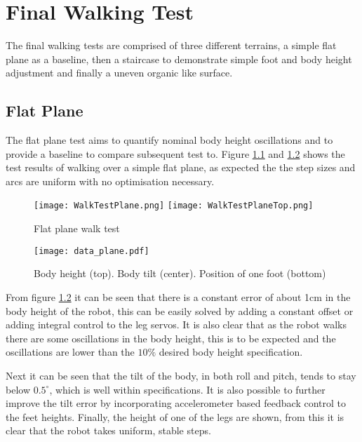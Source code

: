 \chapter{Final Walking Test}
    The final walking tests are comprised of three different terrains, a simple flat plane as a baseline, then a staircase to demonstrate simple foot and body height adjustment and
    finally a uneven organic like surface.
    

    \section{Flat Plane}
    The flat plane test aims to quantify nominal body height oscillations and to provide a baseline to compare subsequent test to.
    Figure \ref{fig:plane_test} and \ref{fig:plane_test_data} shows the test results of walking over a simple flat plane, as expected the the step sizes and arcs are uniform with no optimisation necessary.
    \begin{figure}[h]
        \centering
        \texttt{[image: WalkTestPlane.png]}
        \texttt{[image: WalkTestPlaneTop.png]}
        \caption{Flat plane walk test}
        \label{fig:plane_test}
    \end{figure}
    \begin{figure}[h]
        \centering
        \texttt{[image: data\_plane.pdf]}
        \caption{Body height (top). Body tilt (center). Position of one foot (bottom)}
        \label{fig:plane_test_data}
    \end{figure}
    
    \noindent
    From figure \ref{fig:plane_test_data} it can be seen that there is a constant error of about 1cm in the body height of the robot, this can be easily solved by adding a constant offset or adding integral 
    control to the leg servos. It is also clear that as the robot walks there are some oscillations in the body height, this is to be expected and the oscillations are lower than the \(10\%\) desired body height specification.
        
    Next it can be seen that the tilt of the body, in both roll and pitch, tends to stay below \(0.5^\circ\), which is well within specifications. It is also possible to further improve
    the tilt error by incorporating accelerometer based feedback control to the feet heights. Finally, the height of one of the legs are shown, from this it is clear that the robot takes
    uniform, stable steps.

